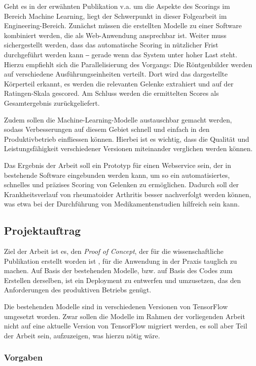 Geht es in der erwähnten Publikation \cite{rohrbach2019} v.a. um die Aspekte des Scorings im Bereich Machine Learning, liegt der Schwerpunkt in dieser Folgearbeit im Engineering-Bereich. Zunächst müssen die erstellten Modelle zu einer Software kombiniert werden, die als Web-Anwendung ansprechbar ist. Weiter muss sichergestellt werden, dass das automatische Scoring in nützlicher Frist durchgeführt werden kann ‒ gerade wenn das System unter hoher Last steht. Hierzu empfiehlt sich die Parallelisierung des Vorgangs: Die Röntgenbilder werden auf verschiedene Ausführungseinheiten verteilt. Dort wird das dargestellte Körperteil erkannt, es werden die relevanten Gelenke extrahiert und auf der Ratingen-Skala gescored. Am Schluss werden die ermittelten Scores als Gesamtergebnis zurückgeliefert.

Zudem sollen die Machine-Learning-Modelle austauschbar gemacht werden, sodass Verbesserungen auf diesem Gebiet schnell und einfach in den Produktivbetrieb einfliessen können. Hierbei ist es wichtig, dass die Qualität und Leistungsfähigkeit verschiedener Versionen miteinander verglichen werden können.

Das Ergebnis der Arbeit soll ein Prototyp für einen Webservice sein, der in bestehende Software eingebunden werden kann, um so ein automatisiertes, schnelles und präzises Scoring von Gelenken zu ermöglichen. Dadurch soll der Krankheitsverlauf von rheumatoider Arthritis besser nachverfolgt werden können, was etwa bei der Durchführung von Medikamentenstudien hilfreich sein kann.

\subsection{Projektauftrag}
\label{sec:projektauftrag}

Ziel der Arbeit ist es, den \textit{Proof of Concept}, der für die wissenschaftliche Publikation erstellt worden ist \cite{rohrbach2019}, für die Anwendung in der Praxis tauglich zu machen. Auf Basis der bestehenden Modelle, bzw. auf Basis des Codes zum Erstellen derselben, ist ein Deployment zu entwerfen und umzusetzen, das den Anforderungen des produktiven Betriebs genügt.

Die bestehenden Modelle sind in verschiedenen Versionen von TensorFlow umgesetzt worden. Zwar sollen die Modelle im Rahmen der vorliegenden Arbeit nicht auf eine aktuelle Version von TensorFlow migriert werden, es soll aber Teil der Arbeit sein, aufzuzeigen, was hierzu nötig wäre.

\subsubsection{Vorgaben}

